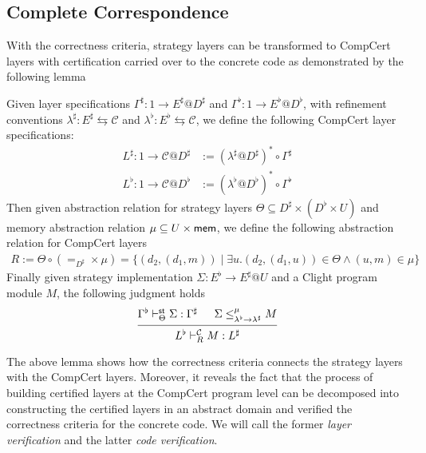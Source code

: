 \documentclass[acmsmall,review,anonymous]{acmart}\settopmatter{printfolios=true,printccs=false,printacmref=false}
\begin{document}
\subsection{Complete Correspondence}
\label{sec:stcal:correspondence}

With the correctness criteria, strategy layers
can be transformed to CompCert layers with
certification carried over
to the concrete code as demonstrated
by the following lemma

\begin{lemma}
  \label{lemma:relating}
  Given layer specifications
  $\Gamma^\sharp: 1 \rightarrow E^\sharp @D^\sharp$ 
  and $\Gamma^\flat: 1 \rightarrow E^\flat @D^\flat$,
  with refinement conventions
  $\lambda^\sharp: E^\sharp \leftrightarrows \mathcal{C}$
  and $\lambda^\flat: E^\flat \leftrightarrows \mathcal{C}$,
  we define the following CompCert layer specifications:
  \begin{align*}
    L^\sharp: 1 \rightarrow \mathcal{C}@D^\sharp
    & := (\lambda^\sharp @D^\sharp)^* \circ \Gamma^\sharp\\
    L^\flat: 1 \rightarrow \mathcal{C}@D^\flat
    & := (\lambda^\flat @D^\flat)^* \circ \Gamma^\flat
  \end{align*}
  Then given
  abstraction relation for strategy layers
  $\Theta \subseteq D^\sharp \times (D^\flat \times U)$
  and memory abstraction relation
  $\mu \subseteq U \times  \mathsf{mem} $,
  we define the following abstraction relation for CompCert layers
  \begin{align*}
    R := \Theta \circ (=_{D^\sharp} \times \mu)
    = \{ (d_2, (d_1, m))
       \mid \exists u. (d_2, (d_1, u)) \in \Theta \wedge (u, m) \in \mu\}
  \end{align*}
  Finally given strategy implementation
  $\Sigma: E^\flat \rightarrow E^\sharp @U$
  and a Clight program module $M$,
  the following judgment holds
  \[
    \begin{prooftree}
      \hypo{\Gamma^\flat \vdash^\kw{st}_\Theta \Sigma : \Gamma^\sharp}
      \hypo{\Sigma \le^\mu_{\lambda^\flat \rightarrow \lambda^\sharp} M}
      \infer2{L^\flat \vdash^\mathcal{C}_R M: L^\sharp}
    \end{prooftree}
  \]
\end{lemma}

The above lemma shows
how the correctness criteria
connects the strategy layers
with the CompCert layers.
Moreover, it reveals the fact
that the process of building certified layers
at the CompCert program level
can be decomposed into
constructing the certified layers in an abstract domain
and verified the correctness criteria
for the concrete code.
We will call the former \emph{layer verification}
and the latter \emph{code verification}.
\end{document}
